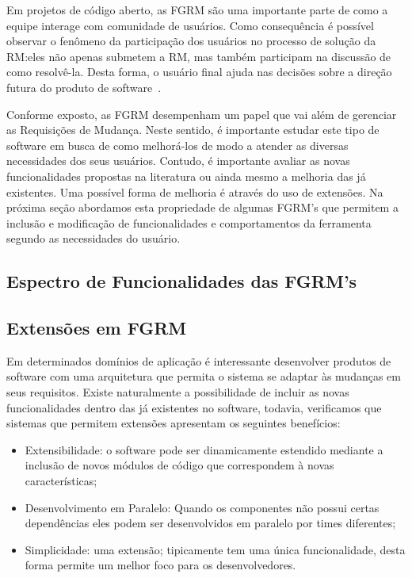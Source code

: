 Em projetos de código aberto, as FGRM são uma importante parte de como a equipe
interage com comunidade de usuários. Como consequência é possível observar o
fenômeno da participação dos usuários no processo de solução da RM:\@ eles não
apenas submetem a RM, mas também participam na discussão de como resolvê-la.
Desta forma, o usuário final ajuda nas decisões sobre a direção futura do
produto de software~\cite{breu2010information}.

Conforme exposto, as FGRM desempenham um papel que vai além de gerenciar as
Requisições de Mudança.  Neste sentido, é importante estudar este tipo de
software em busca de como melhorá-los de modo a atender as diversas necessidades
dos seus usuários. Contudo, é importante avaliar as novas funcionalidades
propostas na li\-te\-ra\-tu\-ra ou ainda mesmo a melhoria das já existentes. Uma
possível forma de melhoria é através do uso de extensões. Na próxima seção
abordamos esta propriedade de algumas FGRM's que permitem a inclusão e
modificação de funcionalidades e comportamentos da ferramenta segundo as
necessidades do usuário.

\subsection{Espectro de Funcionalidades das FGRM's}
\label{sub:espectro_funcionalidades_fgrm}



\subsection{Extensões em FGRM}
\label{subsec:manutencao_visao_geral_extensoes_fgrm}

Em determinados domínios de aplicação é interessante desenvolver produtos de
software com uma arquitetura que permita o sistema se adaptar às mudanças em
seus requisitos. Existe naturalmente a possibilidade de incluir as novas
funcionalidades dentro das já existentes no software, todavia, verificamos que
sistemas que permitem extensões apresentam os seguintes benefícios:

\begin{itemize}
	\item Extensibilidade: o software pode ser dinamicamente estendido mediante
		a inclusão de novos módulos de código que correspondem à novas
		características;
	\item Desenvolvimento em Paralelo: Quando os componentes não possui certas
		dependências eles podem ser desenvolvidos em paralelo por times
		diferentes;
	\item Simplicidade: uma  extensão; tipicamente tem uma única funcionalidade,
		desta forma permite um melhor foco para os desenvolvedores.
\end{itemize}

